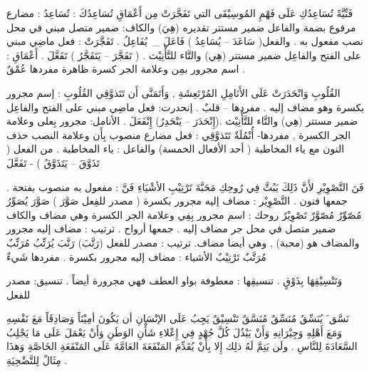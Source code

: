 \documentclass[a4paper]{article}
\begin{document}
\begin{flushright}
فَنِّيَّةً تُسَاعِدُكِ عَلَى فَهْمِ المُوسِيْقَى التي تَفَجَّرَتْ مِن أَعْمَاقِ
تُسَاعِدُكَ : تُسَاعِدُ : مضارع مرفوع بضمة والفاعل ضمير مستتر تقديره (هِيَ) والكاف: ضمير متصل مبني في محل نصب مفعول به . والفعل( سَاعَدَ – يُسَاعِدُ ) فَاعَلَ _\ يُفَاعِلُ .
تَفَجَّرَتْ : فعل ماضِي مبني على الفتح  والفاعِل ضمير مستتر (هِي)
            والتَّاء للتَّأْنِيْث . ( تَفَجَّرَ – يَتَفَجَّرُ ) تَفَعَّلَ .
أَعْمَاقِ : اسم مجرور بمِن وعلامة الجر كسرة ظاهرة
          مفردها عُمْقٌ .
 
القُلُوبِ وَانْحَدَرَتْ عَلَى الأَنَامِلِ المُرْتَعِشَةِ , وَأَتَمَنَّى أَن تَتَذوَّقِي
القُلُوبِ : إسم مجرور بكسرة وهو مضاف إليه . مفردها – قلبٌ .
إنحدرت: فعل ماضِي مبني على الفتح  والفاعِل ضمير مستتر (هِي)
            والتَّاء للتَّأْنِيْث .(إِنْحَدَرَ – يَنْحَدِرُ) إِنْفَعَلَ .
الأنامل: مجرور بِعلى وعلامة الجر الكسرة , مفردها- أُنْمُلَةٌ
تَتَذوَّقِي : فعل مضارع منصوب بِأَن وعلامة النصب حذف النون مع ياء
      المخاطبة ( أحد الأفعال الخمسة) والفاعل : ياء المخاطبة .
      من الفعل ( تَذَوَّقَ – يَتَذَوَّقُ ) - تَفَعَّلَ
 
فَنَ التَّصْوِيْرِ لأَنَّ ذَلِكَ يَبُثَّ فِي رُوحِكِ مَحَبَّةَ تَرْتِيْبِ الأشْيَاءِ
فَنَّ : مفعول به منصوب بفتحة . جمعها فنون .
التَّصْوِيْر : مضاف إليه مجرور بكسرة ( مصدر للفِعل صَوَّرَ )
      صَوَّرَ  يُصَوِّرُ  مُصّوِّرٌ  مُصّوَّرٌ  تَصْوِيْرٌ
روحك : اسم مجرور بِفِي وعلامة الجر الكسرة وهي مضاف والكاف     
      ضمير متصل في محل جر مضاف إليه . جمعها أرواح .
ترتيب : مضاف إليه مجرور والمضاف هو (محبة) , وهي أيضا مضاف.
      ترتيب : مصدر للفعل (رَتَّبَ) رَتَّبَ يُرَتِّبُ مُرَتِّبٌ مُرَتَّبٌ تَرْتِيْبٌ
الأشياء : مضاف إليه مجرور بكسرة . مفردها شَيءٌ
 
وَتَنْسِيْقِهَا بِذَوْقٍ .
تنسيقِها : معطوفة بواو العطف فهي مجرورة أيضاً . تنسيق: مصدر للفعل
 
          نَسَّق َ يُنَسِّقُ  مُنَسِّقٌ  مُنَسَّقٌ  تَنْسِيْقٌ
يَجِبُ عَلَى الإنْسَانِ أن يَكُونَ أمِيْنَاً وَصَادِقَاً مَعَ نَفْسِهِ وَمَعَ أَهْلِهِ وَجِيْرَانِهِ وَأَنْ يَبْذُلَ كُلَّ جُهْدٍ فِي إِعْلاءِ شَأْنِ الوَطَنِ وَأَنْ يَعْمَلَ عَلَى مَا يَجْلِبُ السَّعَادَةَ لِلنَّاسِ . ولَن يَتِمَّ لَهُ ذلِك إِلا بِأَنْ يُقَدِّمَ المَنْفَعَةَ العَامَّةَ عَلَى المَنْفَعَةِ الخَاصَّةِ وَهذَا مِثَالٌ لِلتَّضْحِيَةِ .
 


\end{flushright}
\end{document}
